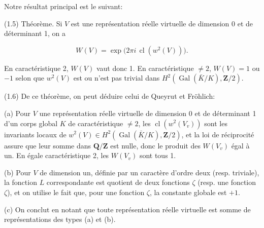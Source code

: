 \documentclass[9pt,twoside]{extarticle}
\begin{document}
{Notre résultat principal est le suivant:\par

(1.5) Théorème. Si \(V\) est une représentation réelle virtuelle de dimension 0 et de déterminant 1, on a\par

\[
W(V)=\exp\bigl(2\pi i\,\operatorname{cl}(w^2(V))\bigr).
\]

En caractéristique 2, \(W(V)\) vaut donc 1. En caractéristique \(\ne2\), \(W(V)=1\) ou \(-1\) selon que \(w^2(V)\) est ou n’est pas trivial dans \(H^2(\operatorname{Gal}(\bar K/K),\mathbf Z/2)\).\par

(1.6) De ce théorème, on peut déduire celui de Queyrut et Fröhlich:\par

(a) Pour \(V\) une représentation réelle virtuelle de dimension 0 et de déterminant 1 d’un corps global \(K\) de caractéristique \(\ne2\), les \(\operatorname{cl}(w^2(V_v))\) sont les invariants locaux de \(w^2(V)\in H^2(\operatorname{Gal}(\bar K/K),\mathbf Z/2)\), et la loi de réciprocité assure que leur somme dans \(\mathbf Q/\mathbf Z\) est nulle, donc le produit des \(W(V_v)\) égal à un. En égale caractéristique 2, les \(W(V_v)\) sont tous 1.\par

(b) Pour \(V\) de dimension un, définie par un caractère d’ordre deux (resp. triviale), la fonction \(L\) correspondante est quotient de deux fonctions \(\zeta\) (resp. une fonction \(\zeta\)), et on utilise le fait que, pour une fonction \(\zeta\), la constante globale est \(+1\).\par

(c) On conclut en notant que toute représentation réelle virtuelle est somme de représentations des types (a) et (b).\par
}
\end{document}
